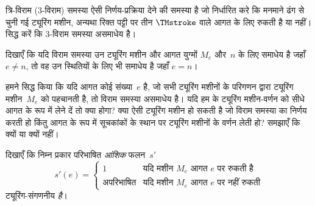 \documentclass[../../../include/open-logic-section]{subfiles}
\begin{document}
\begin{prob}
त्रि-विराम (3-विराम) समस्या ऐसी निर्णय-प्रक्रिया देने की समस्या है जो
निर्धारित करे कि मनमाने ढंग से चुनी गई ट्यूरिंग मशीन, अन्यथा रिक्त पट्टी
पर तीन $\TMstroke$ वाले आगत के लिए रुकती है या नहीं। सिद्ध करें कि
3-विराम समस्या असमाधेय है।
\end{prob}

\begin{prob}
दिखाएँ कि यदि विराम समस्या उन ट्यूरिंग मशीन और आगत युग्मों $M_e$ और~$n$
के लिए समाधेय है जहाँ $e \neq n$, तो वह उन स्थितियों के लिए भी समाधेय
है जहाँ $e = n$।
\end{prob}

\begin{prob}
हमने सिद्ध किया कि यदि आगत कोई संख्या~$e$ है, जो सभी ट्यूरिंग मशीनों के
परिगणन द्वारा ट्यूरिंग मशीन~$M_e$ को पहचानती है, तो विराम समस्या असमाधेय
है। यदि हम  के ट्यूरिंग मशीन-वर्णन को सीधे
आगत के रूप में लेने दें तो क्या होगा? क्या ऐसी ट्यूरिंग मशीन हो सकती है
जो विराम समस्या का निर्णय करती हो किंतु आगत के रूप में सूचकांकों के
स्थान पर ट्यूरिंग मशीनों के वर्णन लेती हो? समझाएँ कि क्यों या क्यों नहीं।
\end{prob}

\begin{prob} दिखाएँ कि निम्न प्रकार परिभाषित \emph{आंशिक} फलन~$s'$
  \[
  s'(e) =
  \begin{cases}
    \text{1} & \text{यदि मशीन~$M_e$ आगत $e$ पर रुकती है}\\
    \text{अपरिभाषित} & \text{यदि मशीन~$M_e$ आगत $e$ पर नहीं रुकती}
  \end{cases}
  \]
  ट्यूरिंग-संगणनीय \emph{है}।
\end{prob}
\end{document}
